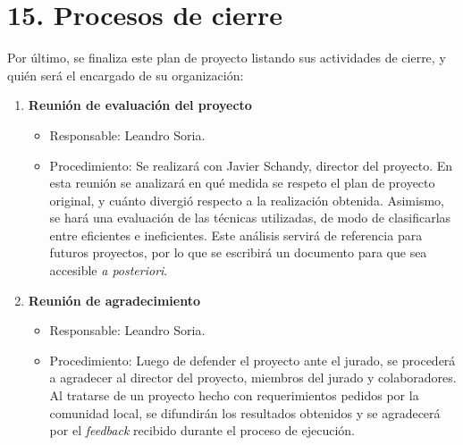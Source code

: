 \documentclass[
11pt, %
]{charter}
\begin{document}
\section{15. Procesos de cierre}    
\label{sec:cierre}
Por último, se finaliza este plan de proyecto listando sus actividades de cierre, y quién será el encargado de su organización:

\begin{enumerate}
	\item \textbf{Reunión de evaluación del proyecto}
	\begin{itemize}
		\item Responsable: Leandro Soria.
		\item Procedimiento: Se realizará con Javier Schandy, director del proyecto. En esta reunión se analizará en qué medida se respeto el plan de proyecto original, y cuánto divergió respecto a la realización obtenida. Asimismo, se hará una evaluación de las técnicas utilizadas, de modo de clasificarlas entre eficientes e ineficientes. Este análisis servirá de referencia para futuros proyectos, por lo que se escribirá un documento para que sea accesible \emph{a posteriori}.
	\end{itemize}
	\item \textbf{Reunión de agradecimiento}
	\begin{itemize}
		\item Responsable: Leandro Soria.
		\item Procedimiento: Luego de defender el proyecto ante el jurado, se procederá a agradecer al director del proyecto, miembros del jurado y colaboradores. Al tratarse de un proyecto hecho con requerimientos pedidos por la comunidad local, se difundirán los resultados obtenidos y se agradecerá por el \emph{feedback} recibido durante el proceso de ejecución.  
	\end{itemize}
\end{enumerate} 
\end{document}
